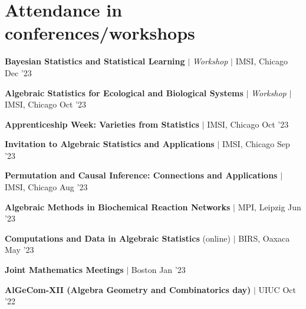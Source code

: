\section{Attendance in conferences/workshops}
\resumeSubHeadingListStart


\resumeProjectHeading
{\textbf{Bayesian Statistics and Statistical Learning} $|$ \textit{Workshop} $|$ IMSI, Chicago}
{Dec '23}
{}
\vspace{\mygap}

\resumeProjectHeading
{\textbf{Algebraic Statistics for Ecological and Biological Systems} $|$ \textit{Workshop}  $|$ IMSI, Chicago}
{Oct '23}
{}
\vspace{\mygap}

\resumeProjectHeading
{\textbf{Apprenticeship Week: Varieties from Statistics} $|$ IMSI, Chicago}
{{Oct '23}}
{}
\vspace{\mygap}

\resumeProjectHeading
{\textbf{Invitation to Algebraic Statistics and Applications}   $|$ IMSI, Chicago}
{{Sep '23}}
{}
\vspace{\mygap}

\resumeProjectHeading
{\textbf{Permutation and Causal Inference: Connections and Applications} $|$ IMSI, Chicago}
{{Aug '23}}
{}
\vspace{\mygap}

\resumeProjectHeading
{\textbf{Algebraic Methods in Biochemical Reaction Networks}  $|$ MPI, Leipzig}
{{Jun '23}}
{}
\vspace{\mygap}

\resumeProjectHeading
{\textbf{Computations and Data in Algebraic Statistics} (online) $|$ BIRS, Oaxaca}
{May '23}
{}
\vspace{\mygap}

\resumeProjectHeading
{\textbf{Joint Mathematics Meetings}   $|$ Boston }
{Jan '23}
{}
\vspace{\mygap}

\resumeProjectHeading
{\textbf{AlGeCom-XII (Algebra Geometry and Combinatorics day)}  $|$ UIUC}
{Oct '22}
{}


